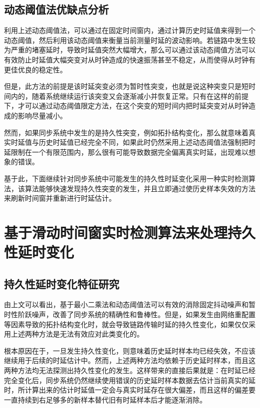 \subsection{动态阈值法优缺点分析}
利用上述动态阈值法，可以通过在固定时间窗内，通过计算历史时延值来得到一个动态阈值，然后利用该动态阈值来衡量当前测量时延的波动影响。若链路中发生较为严重的堵塞延时，导致时延值突然大幅增大，那么可以通过该动态阈值方法可以有效防止时延值大幅突变对从时钟造成的快速振荡甚至不稳定，从而使得从时钟有更佳优良的稳定性。

但是，此方法的前提是该时延突变必须为暂时性突变，也就是说这种突变只是短时间内的，随着系统继续运行该突变又会逐渐减小并恢复正常。只有在这样的前提下，才可以通过动态阈值限定方法，在这个突变的短时间内把时延突变对从时钟造成的影响尽量减小。

然而，如果同步系统中发生的是持久性突变，例如拓扑结构变化，那么就意味着真实时延值与历史时延值已经完全不同，如果此时仍然采用上述动态阈值法强制把时延限制在一个有限范围内，那么很有可能导致数据完全偏离真实时延，出现难以想象的错误。

基于此，下面继续针对同步系统中可能发生的持久性时延变化采用一种实时检测算法，该算法能够快速发现持久性突变的发生，并且立即通过使历史样本失效的方法来刷新时间窗并重新进行时延估计。

\section{基于滑动时间窗实时检测算法来处理持久性延时变化}
\subsection{持久性延时变化特征研究}
由上文可以看出，基于最小二乘法和动态阈值法可以有效的消除固定抖动噪声和暂时性阶跃噪声，改善了同步系统的精确性和鲁棒性。但是，如果发生由网络重配置等因素导致的拓扑结构变化时，就会导致链路传输时延的持久性变化，如果仅仅采用上述两种方法是无法有效应对此类变化的。

根本原因在于，一旦发生持久性变化，则意味着历史延时样本均已经失效，不应该继续用于后续的时延估计中。然而，上述两种方法均依赖于历史延时样本，而且这两种方法均无法探测出持久性变化的发生。这样带来的直接后果就是：在时延已经完全变化后，同步系统仍然继续使用错误的历史延时样本数据去估计当前真实的延时，所计算出来的估计时延值一定会与真实时延存在很大偏差，而且这样的偏差要一直持续到右足够多的新样本替代旧有时延样本后才能逐渐消除。



